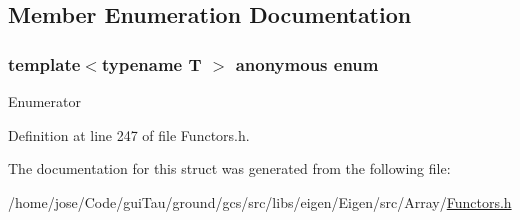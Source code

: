 \subsection{Member Enumeration Documentation}
\hypertarget{structei__functor__traits_3_01std_1_1less_3_01_t_01_4_01_4_aeb96279d568b7234040424a4dbe13bd5}{\subsubsection[{anonymous enum}]{\setlength{\rightskip}{0pt plus 5cm}template$<$typename T $>$ anonymous enum}}\label{structei__functor__traits_3_01std_1_1less_3_01_t_01_4_01_4_aeb96279d568b7234040424a4dbe13bd5}
\begin{Desc}
\item[Enumerator]\par
\begin{description}
\item[{\em 
\hypertarget{structei__functor__traits_3_01std_1_1less_3_01_t_01_4_01_4_aeb96279d568b7234040424a4dbe13bd5a844f45e6840d879cec36836b1846bd67}{Cost}\label{structei__functor__traits_3_01std_1_1less_3_01_t_01_4_01_4_aeb96279d568b7234040424a4dbe13bd5a844f45e6840d879cec36836b1846bd67}
}]\item[{\em 
\hypertarget{structei__functor__traits_3_01std_1_1less_3_01_t_01_4_01_4_aeb96279d568b7234040424a4dbe13bd5ad468e82fd861cfbc49f392b174e6b0b7}{Packet\-Access}\label{structei__functor__traits_3_01std_1_1less_3_01_t_01_4_01_4_aeb96279d568b7234040424a4dbe13bd5ad468e82fd861cfbc49f392b174e6b0b7}
}]\end{description}
\end{Desc}


Definition at line 247 of file Functors.\-h.



The documentation for this struct was generated from the following file\-:\begin{DoxyCompactItemize}
\item 
/home/jose/\-Code/gui\-Tau/ground/gcs/src/libs/eigen/\-Eigen/src/\-Array/\hyperlink{_array_2_functors_8h}{Functors.\-h}\end{DoxyCompactItemize}
